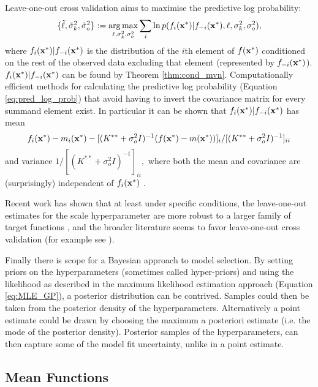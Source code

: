 Leave-one-out cross validation aims to maximise the predictive log
probability:
\begin{align}
    \{\tilde{\ell}, \tilde{\sigma}^2_k, \tilde{\sigma}^2_o\}
    := \operatorname*{arg\,max}_{\ell, \sigma^2_k, \sigma^2_o} \sum_{i}
    \ln p(f_i(\mathbf{x}^\ast) | f_{-i}(\mathbf{x}^\ast), \ell, \sigma^2_k, \sigma^2_o),
    \label{eq:pred_log_prob}
\end{align}
where $f_i(\mathbf{x}^\ast) | f_{-i}(\mathbf{x}^\ast)$ is the distribution of the
$i$th element of $f(\mathbf{x}^\ast)$ conditioned on the rest of the
observed data excluding that element (represented by $f_{-i}(\mathbf{x}^\ast)$).
$f_i(\mathbf{x}^\ast) | f_{-i}(\mathbf{x}^\ast)$ can be found by
Theorem \ref{thm:cond_mvn}. Computationally efficient methods for calculating
the predictive log probability (Equation \ref{eq:pred_log_prob})
that avoid having to invert the covariance
matrix for every summand element exist. In particular it can be shown that
$f_i(\mathbf{x}^\ast) | f_{-i}(\mathbf{x}^\ast)$ has mean
$$
    f_i(\mathbf{x}^\ast) - m_i(\mathbf{x}^\ast)
    - [(K^{**} + \sigma^2_o I)^{-1}(f(\mathbf{x}^\ast) - m(\mathbf{x}^\ast))]_i
    /[(K^{**} + \sigma^2_o I)^{-1}]_{ii}
$$
and variance $1/[(K^{**} + \sigma^2_o I)^{-1}]_{ii},$ where both the mean and
covariance are (surprisingly) independent of $f_i(\mathbf{x}^\ast)$
\parencite[116]{rasmussen_gaussian_2008}.

Recent work has shown that at least under specific conditions, the
leave-one-out estimates for the scale hyperparameter are more robust to a larger
family of target functions \parencite{naslidnyk_comparing_2024}, and the
broader literature seems to favor leave-one-out cross validation (for example
see \cite{gutmann_bayesian_2016}).

Finally there is scope for a Bayesian approach to model selection. By setting
priors on the hyperparameters (sometimes called hyper-priors)
and using the likelihood as described
in the maximum likelihood estimation approach (Equation \ref{eq:MLE_GP}),
a posterior distribution can be
contrived. Samples could then be taken from the posterior density
of the hyperparameters. Alternatively a point estimate could be drawn by
choosing the maximum a posteriori estimate (i.e. the mode of the
posterior density). Posterior
samples of the hyperparameters, can then capture some of the model fit
uncertainty, unlike in a point estimate.

\subsection*{Mean Functions}

